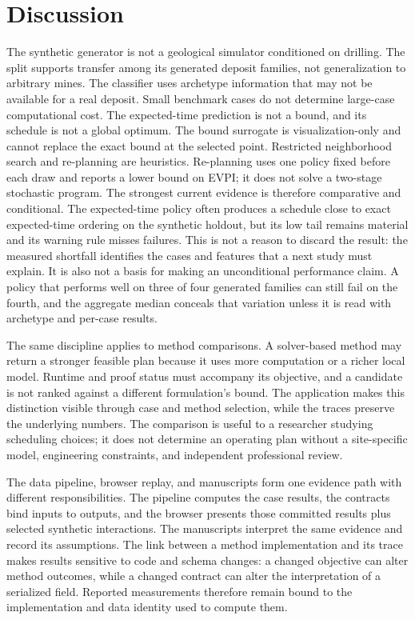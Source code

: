 \documentclass[11pt]{article}
\begin{document}
\section{Discussion}
The synthetic generator is not a geological simulator conditioned on drilling. The split supports transfer among its generated deposit families, not generalization to arbitrary mines. The classifier uses archetype information that may not be available for a real deposit. Small benchmark cases do not determine large-case computational cost. The expected-time prediction is not a bound, and its schedule is not a global optimum. The bound surrogate is visualization-only and cannot replace the exact bound at the selected point. Restricted neighborhood search and re-planning are heuristics. Re-planning uses one policy fixed before each draw and reports a lower bound on EVPI; it does not solve a two-stage stochastic program.
The strongest current evidence is therefore comparative and conditional. The expected-time policy often produces a schedule close to exact expected-time ordering on the synthetic holdout, but its low tail remains material and its warning rule misses failures. This is not a reason to discard the result: the measured shortfall identifies the cases and features that a next study must explain. It is also not a basis for making an unconditional performance claim. A policy that performs well on three of four generated families can still fail on the fourth, and the aggregate median conceals that variation unless it is read with archetype and per-case results.

The same discipline applies to method comparisons. A solver-based method may return a stronger feasible plan because it uses more computation or a richer local model. Runtime and proof status must accompany its objective, and a candidate is not ranked against a different formulation's bound. The application makes this distinction visible through case and method selection, while the traces preserve the underlying numbers. The comparison is useful to a researcher studying scheduling choices; it does not determine an operating plan without a site-specific model, engineering constraints, and independent professional review.

The data pipeline, browser replay, and manuscripts form one evidence path with different responsibilities. The pipeline computes the case results, the contracts bind inputs to outputs, and the browser presents those committed results plus selected synthetic interactions. The manuscripts interpret the same evidence and record its assumptions. The link between a method implementation and its trace makes results sensitive to code and schema changes: a changed objective can alter method outcomes, while a changed contract can alter the interpretation of a serialized field. Reported measurements therefore remain bound to the implementation and data identity used to compute them.
\end{document}
